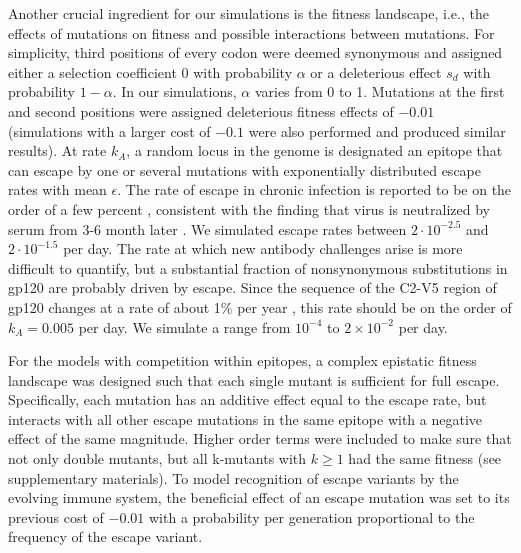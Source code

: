\documentclass[11pt]{article}
\begin{document}
Another crucial ingredient for our simulations is the fitness landscape,
i.e., the effects of mutations on fitness and possible interactions
between mutations. For simplicity, third positions of every codon were
deemed synonymous and assigned either a selection coefficient $0$ with
probability $\alpha$ or a deleterious effect $s_d$ with probability
$1-\alpha$. In our simulations, $\alpha$ varies from 0 to 1.
Mutations at the first and second positions were assigned deleterious 
fitness effects of $-0.01$ (simulations with a larger cost of $-0.1$ were also
performed and produced similar results). At 
rate $k_A$, a random locus in the genome is designated an epitope that can
escape by one or several mutations with exponentially distributed escape rates
with mean $\epsilon$. The rate of escape in chronic infection is
reported to be on the order of a few percent
\citep{Asquith:2006p28003,moore_limited_2009}, consistent with the
finding that virus is neutralized by serum from 3-6 month later
\citep{richman_rapid_2003}. We simulated escape rates between $2 \cdot
10^{-2.5}$ and $2 \cdot 10^{-1.5}$ per day. 
The rate at which new antibody challenges arise is more difficult to
quantify, but a substantial fraction of nonsynonymous substitutions in gp120 are
probably driven by escape. Since the sequence of the C2-V5 region of
gp120  changes at a rate of about 1\% per year
\citep{shankarappa_consistent_1999}, this rate should be on the order of
$k_A=0.005$ per day. We simulate a range from $10^{-4}$ to $2\times 10^{-2}$ per day.

For the models with competition within epitopes, a complex epistatic fitness
landscape was designed such that each single mutant is sufficient for full
escape. Specifically, each mutation has an additive effect equal to the
escape rate, but interacts with all other escape mutations in the same
epitope with a negative effect of the same magnitude. 
Higher order terms were included to make sure that not
only double mutants, but all k-mutants with $k \geq 1$ had the same fitness (see
supplementary materials). To model recognition of escape variants by the
evolving immune system, the beneficial effect of an escape mutation was set
to its previous cost of $-0.01$ with a probability per generation proportional to
the frequency of the escape variant.
\end{document}
